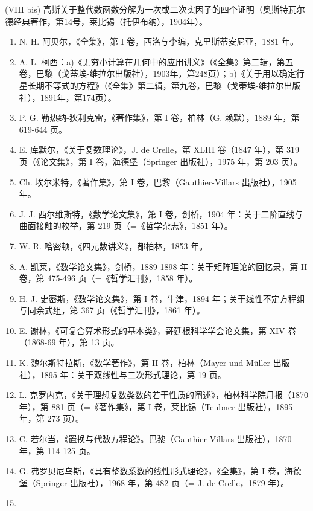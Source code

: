 (VIII bis) 高斯关于整代数函数分解为一次或二次实因子的四个证明（奥斯特瓦尔德经典著作，第14号，莱比锡（托伊布纳），1904年）。

\begin{enumerate}
\def\labelenumi{(\Roman{enumi})}
\setcounter{enumi}{8}
\item
  N. H. 阿贝尔，《全集》，第 I 卷，西洛与李编，克里斯蒂安尼亚，1881 年。
\item
  A. L. 柯西：a)《无穷小计算在几何中的应用讲义》（《全集》第二辑，第五卷，巴黎（戈蒂埃-维拉尔出版社），1903年，第248页）；b)《关于用以确定行星长期不等式的方程》（《全集》第二辑，第九卷，巴黎（戈蒂埃-维拉尔出版社），1891年，第174页）。
\item
  P. G. 勒热纳-狄利克雷，《著作集》，第 I 卷，柏林（G. 赖默），1889 年，第 619-644 页。
\item
  E. 库默尔，《关于复数理论》，J. de Crelle，第 XLIII 卷（1847 年），第 319 页（《论文集》，第 I 卷，海德堡（Springer 出版社），1975 年，第 203 页）。
\item
  Ch. 埃尔米特，《著作集》，第 I 卷，巴黎（Gauthier-Villars 出版社），1905 年。
\item
  J. J. 西尔维斯特，《数学论文集》，第 I 卷，剑桥，1904 年：关于二阶直线与曲面接触的枚举，第 219 页（=《哲学杂志》，1851 年）。
\item
  W. R. 哈密顿，《四元数讲义》，都柏林，1853 年。
\item
  A. 凯莱，《数学论文集》，剑桥，1889-1898 年：关于矩阵理论的回忆录，第 II 卷，第 475-496 页（=《哲学汇刊》，1858 年）。
\item
  H. J. 史密斯，《数学论文集》，第 I 卷，牛津，1894 年；关于线性不定方程组与同余式组，第 367 页（《哲学汇刊》，1861 年）。
\item
  E. 谢林，《可复合算术形式的基本类》，哥廷根科学学会论文集，第 XIV 卷（1868-69 年），第 13 页。
\item
  K. 魏尔斯特拉斯，《数学著作》，第 II 卷，柏林（Mayer und Müller 出版社），1895 年：关于双线性与二次形式理论，第 19 页。
\item
  L. 克罗内克，《关于理想复数类数的若干性质的阐述》，柏林科学院月报（1870 年），第 881 页（=《著作集》，第 I 卷，莱比锡（Teubner 出版社），1895 年，第 273 页）。
\item
  C. 若尔当，《置换与代数方程论》。巴黎（Gauthier-Villars 出版社），1870 年，第 114-125 页。
\item
  G. 弗罗贝尼乌斯，《具有整数系数的线性形式理论》，《全集》，第 I 卷，海德堡（Springer 出版社），1968 年，第 482 页（= J. de Crelle，1879 年）。
\item

\end{enumerate}
